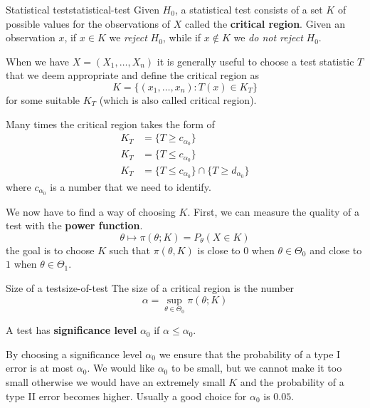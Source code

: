 \documentclass[12pt]{extarticle}
\begin{document}
\begin{definition}{Statistical test}{statistical-test}
    Given $H_0$, a statistical test consists of a set $K$ of possible values for the observations of $X$ called the \textbf{critical region}.
    Given an observation $x$, if $x \in K$ we \emph{reject} $H_0$, while if $x \notin K$ we \emph{do not reject} $H_0$.
\end{definition}

When we have $X = (X_1, \dots, X_n)$ it is generally useful to choose a test statistic $T$ that we deem appropriate and define the critical region as
\begin{equation}
    K = \{ (x_1, \dots, x_n) : T(x) \in K_T \}
\end{equation}
for some suitable $K_T$ (which is also called critical region).

Many times the critical region takes the form of
\begin{align}
    K_T & = \{ T \geq c_{\alpha_0} \}                                \\
    K_T & = \{ T \leq c_{\alpha_0} \}                                \\
    K_T & = \{ T \leq c_{\alpha_0} \} \cap \{ T \geq d_{\alpha_0} \}
\end{align}
where $c_{\alpha_0}$ is a number that we need to identify.

We now have to find a way of choosing $K$.
First, we can measure the quality of a test with the \textbf{power function}.
\begin{equation}
    \theta \mapsto \pi(\theta; K) = P_\theta(X \in K)
\end{equation}
the goal is to choose $K$ such that $\pi(\theta, K)$ is close to $0$ when $\theta \in \Theta_0$ and close to $1$ when $\theta \in \Theta_1$.

\begin{definition}{Size of a test}{size-of-test}
    The size of a critical region is the number
    \begin{equation}
        \alpha = \sup_{\theta \in \Theta_0} \pi(\theta; K)
    \end{equation}

    A test has \textbf{significance level} $\alpha_0$ if $\alpha \leq \alpha_0$.
\end{definition}

By choosing a significance level $\alpha_0$ we ensure that the probability of a type I error is at most $\alpha_0$.
We would like $\alpha_0$ to be small, but we cannot make it too small otherwise we would have an extremely small $K$ and the probability of a type II error becomes higher.
Usually a good choice for $\alpha_0$ is $0.05$.
\end{document}
